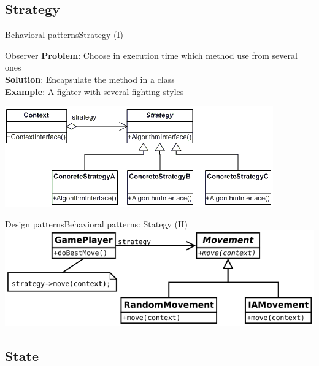 \documentclass[10pt,compress]{beamer} %
\begin{document}
\subsection[Strategy]{Strategy}

\begin{frame}{Behavioral patterns}{Strategy (I)}
	   \begin{block}{Observer}
			\textbf{Problem}: Choose in execution time which method use from several ones\\
			\textbf{Solution}: Encapsulate the method in a class\\
			\textbf{Example}: A fighter with several fighting styles\\
		\end{block}
		\bigskip
		\centering\includegraphics[width=0.7\linewidth]{figs/strategy}
\end{frame}

\begin{frame}[plain]{Design patterns}{Behavioral patterns: Stategy (II)}
	\centering\includegraphics[width=0.8\linewidth]{figs/strategygame}
\end{frame}

\subsection[State]{State}
\end{document}
